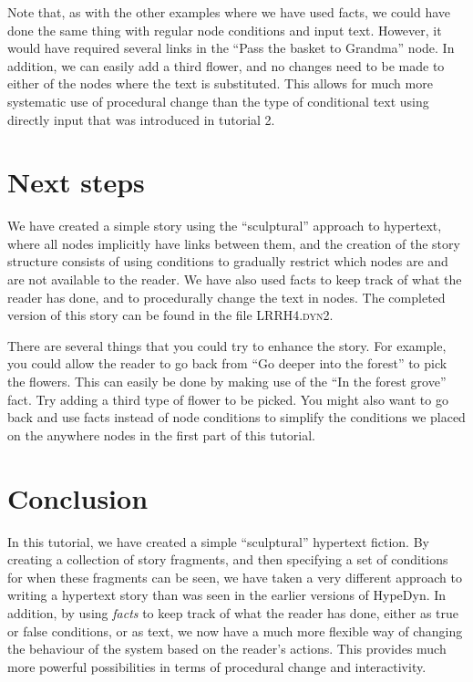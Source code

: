 \documentclass{article}
\begin{document}
Note that, as with the other examples where we have used facts, we could have done the same thing with regular node conditions and input text. However, it would have required several links in the ``Pass the basket to Grandma'' node. In addition, we can easily add a third flower, and no changes need to be made to either of the nodes where the text is substituted. This allows for much more systematic use of procedural change than the type of conditional text using directly input that was introduced in tutorial 2.

\section{Next steps}

We have created a simple story using the ``sculptural'' approach to hypertext, where all nodes implicitly have links between them, and the creation of the story structure consists of using conditions to gradually restrict which nodes are and are not available to the reader. We have also used facts to keep track of what the reader has done, and to procedurally change the text in nodes. The completed version of this story can be found in the file \textsc{LRRH4.dyn2}.

There are several things that you could try to enhance the story. For example, you could allow the reader to go back from ``Go deeper into the forest'' to pick the flowers. This can easily be done by making use of the ``In the forest grove'' fact. Try adding a third type of flower to be picked. You might also want to go back and use facts instead of node conditions to simplify the conditions we placed on the anywhere nodes in the first part of this tutorial.

\section{Conclusion}

In this tutorial, we have created a simple ``sculptural'' hypertext fiction. By creating a collection of story fragments, and then specifying a set of conditions for when these fragments can be seen, we have taken a very different approach to writing a hypertext story than was seen in the earlier versions of HypeDyn. In addition, by using \textit{facts} to keep track of what the reader has done, either as true or false conditions, or as text, we now have a much more flexible way of changing the behaviour of the system based on the reader's actions. This provides much more powerful possibilities in terms of procedural change and interactivity.

% 

  
  
\end{document}
